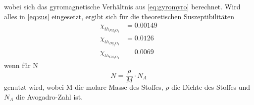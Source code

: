 wobei sich das gyromagnetische Verhältnis aus \autoref{eq:gyromyro} berechnet. 
Wird alles in \autoref{eq:sus} eingesetzt, ergibt sich für die theoretischen Suszeptibilitäten
\begin{align*}
  \chi_{th_{Nd_2 O_3}}&=0.00149\\
  \chi_{th_{Dy_2 O_3}}&=0.0126\\
  \chi_{th_{Gd_2 O_3}}&=0.0069
\end{align*}
wenn für N %
\begin{equation*}
  N=\frac{\rho}{M}\cdot N_{A}
\end{equation*}
genutzt wird, wobei M die molare Masse des Stoffes, $\rho$ die Dichte des Stoffes und $N_A$ die Avogadro-Zahl ist.


%
%
%
%
%
%
